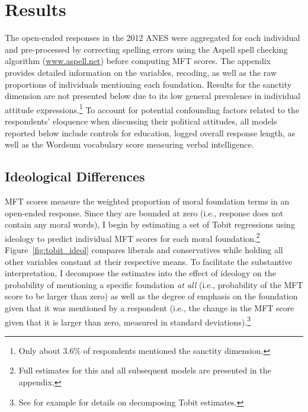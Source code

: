 \documentclass[12pt]{article}
\begin{document}
\section*{Results}

The open-ended responses in the 2012 ANES were aggregated for each individual and pre-processed by correcting spelling errors using the Aspell spell checking algorithm (\url{www.aspell.net}) before computing MFT scores. The appendix provides detailed information on the variables, recoding, as well as the raw proportions of individuals mentioning each foundation. Results for the sanctity dimension are not presented below due to its low general prevalence in individual attitude expressions.\footnote{Only about 3.6\% of respondents mentioned the sanctity dimension.} To account for potential confounding factors related to the respondents' eloquence when discussing their political attitudes, all models reported below include controls for education, logged overall response length, as well as the Wordsum vocabulary score measuring verbal intelligence.




\subsection*{Ideological Differences}

MFT scores measure the weighted proportion of moral foundation terms in an open-ended response. Since they are bounded at zero (i.e., response does not contain any moral words), I begin by estimating a set of Tobit regressions using ideology to predict individual MFT scores for each moral foundation.\footnote{Full estimates for this and all subsequent models are presented in the appendix.} Figure~\ref{fig:tobit_ideol} compares liberals and conservatives while holding all other variables constant at their respective means. To facilitate the substantive interpretation, I decompose the estimates into the effect of ideology on the probability of mentioning a specific foundation \textit{at all} (i.e., probability of the MFT score to be larger than zero) as well as the degree of emphasis on the foundation given that it was mentioned by a respondent (i.e., the change in the MFT score given that it is larger than zero, measured in standard deviations).\footnote{See for example \citet{mcdonald1980uses} for details on decomposing Tobit estimates.}
\end{document}
